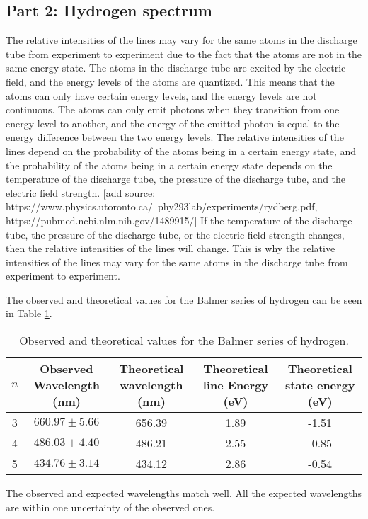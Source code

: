 
\subsection{Part 2: Hydrogen spectrum}



The relative intensities of the lines may vary for the same atoms in the discharge tube from experiment to experiment due to the fact that the atoms are not in the same energy state.
The atoms in the discharge tube are excited by the electric field, and the energy levels of the atoms are quantized.
This means that the atoms can only have certain energy levels, and the energy levels are not continuous.
The atoms can only emit photons when they transition from one energy level to another, and the energy of the emitted photon is equal to the energy difference between the two energy levels.
The relative intensities of the lines depend on the probability of the atoms being in a certain energy state, and the probability of the atoms being in a certain energy state depends on the temperature of the discharge tube,
the pressure of the discharge tube, and the electric field strength. [add source: https://www.physics.utoronto.ca/~phy293lab/experiments/rydberg.pdf, https://pubmed.ncbi.nlm.nih.gov/1489915/] If the temperature of the discharge tube, the pressure of the discharge tube, or the electric field strength changes, then the relative intensities of the lines will change.
This is why the relative intensities of the lines may vary for the same atoms in the discharge tube from experiment to experiment.

The observed and theoretical values for the Balmer series of hydrogen can be seen in Table \ref{tab:my_label}.

\begin{table}[h]
    \centering
    \begin{adjustbox}{width=1.5\textwidth, center}
        \begin{tabular}{|c|c|c|c|c|}
            \hline
            $n$ & Observed Wavelength (nm) & Theoretical wavelength (nm) & Theoretical line Energy (eV) & Theoretical state energy (eV) \\
            \hline
            3   & $660.97 \pm 5.66$        & 656.39                      & 1.89                         & -1.51                         \\
            4   & $486.03 \pm 4.40$        & 486.21                      & 2.55                         & -0.85                         \\
            5   & $434.76 \pm 3.14$        & 434.12                      & 2.86                         & -0.54                         \\
            \hline
        \end{tabular}
    \end{adjustbox}
    \caption{Observed and theoretical values for the Balmer series of hydrogen.}
    \label{tab:my_label}
\end{table}


The observed and expected wavelengths match well. All the expected wavelengths are within one uncertainty of the observed ones.